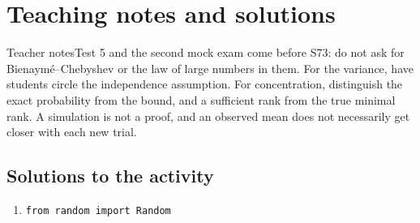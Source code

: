 \ifprof\clearpage\section{Teaching notes and solutions}\begin{profbox}{Teacher notes}Test 5 and the second mock exam come before S73: do not ask for Bienaymé--Chebyshev or the law of large numbers in them. For the variance, have students circle the independence assumption. For concentration, distinguish the exact probability from the bound, and a sufficient rank from the true minimal rank. A simulation is not a proof, and an observed mean does not necessarily get closer with each new trial.\end{profbox}

\subsection{Solutions to the activity}\begin{enumerate}
\item
\begin{lstlisting}
from random import Random


\end{lstlisting}
\end{enumerate}
